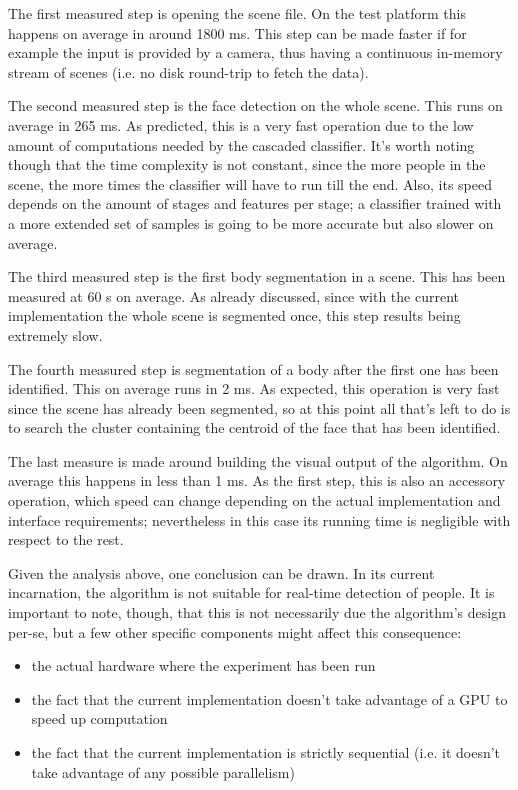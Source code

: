 \documentclass[a4paper,11pt,titlepage]{article}
\begin{document}
The first measured step is opening the scene file. On the test platform this
happens on average in around 1800 ms. This step can be made faster if for
example the input is provided by a camera, thus having a continuous in-memory
stream of scenes (i.e. no disk round-trip to fetch the data).

The second measured step is the face detection on the whole scene. This runs on
average in 265 ms. As predicted, this is a very fast operation due to the low
amount of computations needed by the cascaded classifier. It's worth noting
though that the time complexity is not constant, since the more people in the
scene, the more times the classifier will have to run till the end. Also, its
speed depends on the amount of stages and features per stage; a classifier
trained with a more extended set of samples is going to be more accurate but
also slower on average.

The third measured step is the first body segmentation in a scene. This has been
measured at 60 s on average. As already discussed, since with the current
implementation the whole scene is segmented once, this step results being
extremely slow.

The fourth measured step is segmentation of a body after the first one has been
identified. This on average runs in 2 ms. As expected, this operation is very
fast since the scene has already been segmented, so at this point all that's
left to do is to search the cluster containing the centroid of the face that has
been identified.

The last measure is made around building the visual output of the algorithm. On
average this happens in less than 1 ms. As the first step, this is also an
accessory operation, which speed can change depending on the actual
implementation and interface requirements; nevertheless in this case its running
time is negligible with respect to the rest.

Given the analysis above, one conclusion can be drawn. In its current
incarnation, the algorithm is not suitable for real-time detection of people.
It is important to note, though, that this is not necessarily due the
algorithm's design per-se, but a few other specific components might affect this
consequence:

\begin{itemize}
  \item the actual hardware where the experiment has been run
  \item the fact that the current implementation doesn't take advantage of a
    GPU to speed up computation
  \item the fact that the current implementation is strictly sequential (i.e. it
    doesn't take advantage of any possible parallelism)
\end{itemize}
\end{document}
